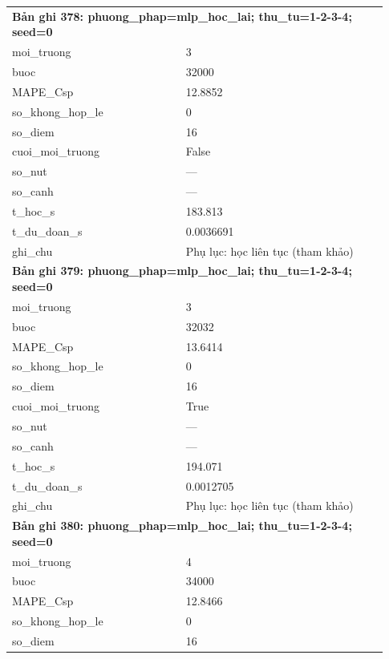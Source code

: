 \begin{longtable}{p{0.43\linewidth}p{0.50\linewidth}}
\midrule
\multicolumn{2}{p{0.95\linewidth}}{\textbf{Bản ghi 378: phuong\_phap=mlp\_hoc\_lai; thu\_tu=1-2-3-4; seed=0}} \\
moi\_\allowbreak truong & 3 \\
buoc & 32000 \\
MAPE\_\allowbreak Csp & 12.8852 \\
so\_\allowbreak khong\_\allowbreak hop\_\allowbreak le & 0 \\
so\_\allowbreak diem & 16 \\
cuoi\_\allowbreak moi\_\allowbreak truong & False \\
so\_\allowbreak nut & — \\
so\_\allowbreak canh & — \\
t\_\allowbreak hoc\_\allowbreak s & 183.813 \\
t\_\allowbreak du\_\allowbreak doan\_\allowbreak s & 0.0036691 \\
ghi\_\allowbreak chu & Phụ lục: học liên tục (tham khảo) \\
\midrule
\multicolumn{2}{p{0.95\linewidth}}{\textbf{Bản ghi 379: phuong\_phap=mlp\_hoc\_lai; thu\_tu=1-2-3-4; seed=0}} \\
moi\_\allowbreak truong & 3 \\
buoc & 32032 \\
MAPE\_\allowbreak Csp & 13.6414 \\
so\_\allowbreak khong\_\allowbreak hop\_\allowbreak le & 0 \\
so\_\allowbreak diem & 16 \\
cuoi\_\allowbreak moi\_\allowbreak truong & True \\
so\_\allowbreak nut & — \\
so\_\allowbreak canh & — \\
t\_\allowbreak hoc\_\allowbreak s & 194.071 \\
t\_\allowbreak du\_\allowbreak doan\_\allowbreak s & 0.0012705 \\
ghi\_\allowbreak chu & Phụ lục: học liên tục (tham khảo) \\
\midrule
\multicolumn{2}{p{0.95\linewidth}}{\textbf{Bản ghi 380: phuong\_phap=mlp\_hoc\_lai; thu\_tu=1-2-3-4; seed=0}} \\
moi\_\allowbreak truong & 4 \\
buoc & 34000 \\
MAPE\_\allowbreak Csp & 12.8466 \\
so\_\allowbreak khong\_\allowbreak hop\_\allowbreak le & 0 \\
so\_\allowbreak diem & 16 \\

\end{longtable}
